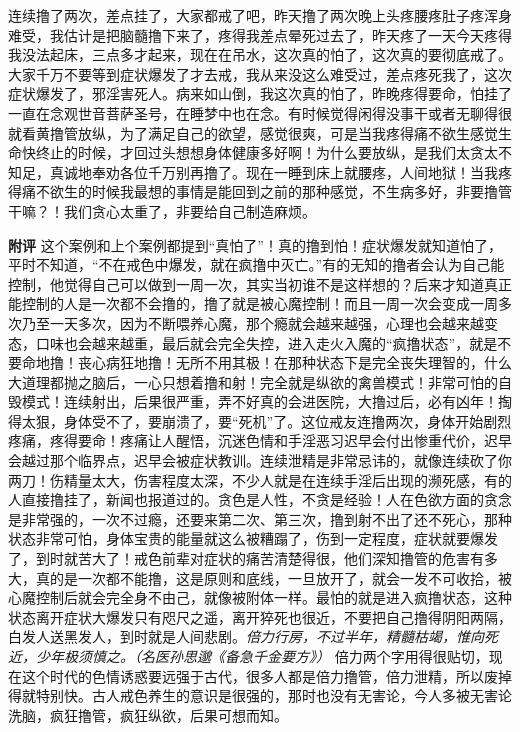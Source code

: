 \begin{case}
    连续撸了两次，差点挂了，大家都戒了吧，昨天撸了两次晚上头疼腰疼肚子疼浑身难受，我估计是把脑髓撸下来了，疼得我差点晕死过去了，昨天疼了一天今天疼得我没法起床，三点多才起来，现在在吊水，这次真的怕了，这次真的要彻底戒了。大家千万不要等到症状爆发了才去戒，我从来没这么难受过，差点疼死我了，这次症状爆发了，邪淫害死人。病来如山倒，我这次真的怕了，昨晚疼得要命，怕挂了一直在念观世音菩萨圣号，在睡梦中也在念。有时候觉得闲得没事干或者无聊得很就看黄撸管放纵，为了满足自己的欲望，感觉很爽，可是当我疼得痛不欲生感觉生命快终止的时候，才回过头想想身体健康多好啊！为什么要放纵，是我们太贪太不知足，真诚地奉劝各位千万别再撸了。现在一睡到床上就腰疼，人间地狱！当我疼得痛不欲生的时候我最想的事情是能回到之前的那种感觉，不生病多好，非要撸管干嘛？！我们贪心太重了，非要给自己制造麻烦。

    \textbf{附评} 这个案例和上个案例都提到“真怕了”！真的撸到怕！症状爆发就知道怕了，平时不知道，“不在戒色中爆发，就在疯撸中灭亡。”有的无知的撸者会认为自己能控制，他觉得自己可以做到一周一次，其实当初谁不是这样想的？后来才知道真正能控制的人是一次都不会撸的，撸了就是被心魔控制！而且一周一次会变成一周多次乃至一天多次，因为不断喂养心魔，那个瘾就会越来越强，心理也会越来越变态，口味也会越来越重，最后就会完全失控，进入走火入魔的“疯撸状态”，就是不要命地撸！丧心病狂地撸！无所不用其极！在那种状态下是完全丧失理智的，什么大道理都抛之脑后，一心只想着撸和射！完全就是纵欲的禽兽模式！非常可怕的自毁模式！连续射出，后果很严重，弄不好真的会进医院，大撸过后，必有凶年！掏得太狠，身体受不了，要崩溃了，要“死机”了。这位戒友连撸两次，身体开始剧烈疼痛，疼得要命！疼痛让人醒悟，沉迷色情和手淫恶习迟早会付出惨重代价，迟早会越过那个临界点，迟早会被症状教训。连续泄精是非常忌讳的，就像连续砍了你两刀！伤精量太大，伤害程度太深，不少人就是在连续手淫后出现的濒死感，有的人直接撸挂了，新闻也报道过的。贪色是人性，不贪是经验！人在色欲方面的贪念是非常强的，一次不过瘾，还要来第二次、第三次，撸到射不出了还不死心，那种状态非常可怕，身体宝贵的能量就这么被糟蹋了，伤到一定程度，症状就要爆发了，到时就苦大了！戒色前辈对症状的痛苦清楚得很，他们深知撸管的危害有多大，真的是一次都不能撸，这是原则和底线，一旦放开了，就会一发不可收拾，被心魔控制后就会完全身不由己，就像被附体一样。最怕的就是进入疯撸状态，这种状态离开症状大爆发只有咫尺之遥，离开猝死也很近，不要把自己撸得阴阳两隔，白发人送黑发人，到时就是人间悲剧。\textit{倍力行房，不过半年，精髓枯竭，惟向死近，少年极须慎之。（名医孙思邈《备急千金要方》）} 倍力两个字用得很贴切，现在这个时代的色情诱惑要远强于古代，很多人都是倍力撸管，倍力泄精，所以废掉得就特别快。古人戒色养生的意识是很强的，那时也没有无害论，今人多被无害论洗脑，疯狂撸管，疯狂纵欲，后果可想而知。
\end{case}


